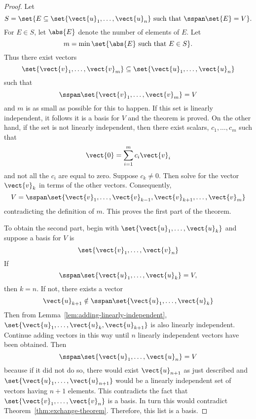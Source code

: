 \begin{proof}Let 
\begin{equation*}
S=\set{E\subseteq \set{\vect{u}_{1},\ldots,\vect{u}_{n}}\text{ such that }%
\sspan\set{E} =V}.
\end{equation*}
For $E\in S$, let $\abs{E}$ denote the number of elements
of $E$. Let 
\begin{equation*}
m= \min \set{\abs{E}\text{ such that }E\in S}.
\end{equation*}
Thus there exist vectors 
\begin{equation*}
\set{\vect{v}_{1},\ldots,\vect{v}_{m}}\subseteq \set{\vect{u}_{1},\ldots,%
\vect{u}_{n}}
\end{equation*}
such that 
\begin{equation*}
\sspan\set{\vect{v}_{1},\ldots,\vect{v}_{m}} =V
\end{equation*}
and $m$ is as small as possible for this to happen. If this set is linearly
independent, it follows it is a basis for $V$ and the theorem is proved. On
the other hand, if the set is not linearly independent, then there exist
scalars, $c_{1},\ldots,c_{m}$ such that 
\begin{equation*}
\vect{0}=\sum_{i=1}^{m}c_{i}\vect{v}_{i}
\end{equation*}
and not all the $c_{i}$ are equal to zero. Suppose $c_{k}\neq 0$. Then solve for the
vector $\vect{v}_{k}$ in terms of the other vectors.
Consequently, 
\begin{equation*}
V=\sspan\set{\vect{v}_{1},\ldots,\vect{v}_{k-1},\vect{v}
_{k+1},\ldots,\vect{v}_{m}}
\end{equation*}
contradicting the definition of $m$. This proves the first part of the
theorem.

To obtain the second part, begin with $\set{\vect{u}_{1},\ldots,\vect{u}
_{k}}$ and suppose a basis for $V$ is 
\begin{equation*}
\set{\vect{v}_{1},\ldots,\vect{v}_{n}} 
\end{equation*}
If 
\begin{equation*}
\sspan\set{\vect{u}_{1},\ldots,\vect{u}_{k}} =V,
\end{equation*}
then $k=n$. If not, there exists a vector 
\begin{equation*}
\vect{u}_{k+1}\notin \sspan\set{\vect{u}_{1},\ldots,\vect{u}
_{k}}
\end{equation*}
Then from Lemma~\ref{lem:adding-linearly-independent}, $\set{\vect{u}_{1},\ldots,\vect{u}_{k},
\vect{u}_{k+1}}$ is also linearly independent. Continue adding vectors in
this way until $n$ linearly independent vectors have been obtained. Then 
\begin{equation*}
\sspan\set{\vect{u}_{1},\ldots,\vect{u}_{n}} =V
\end{equation*}
because if it did not do so, there would exist $\vect{u}_{n+1}$ as just
described and $\set{\vect{u}_{1},\ldots,\vect{u}_{n+1}} $
would be a linearly independent set of vectors having $n+1$ elements. This contradicts the fact that $\set{\vect{v}_{1},\ldots,\vect{v}_{n}} $ is a basis.
 In turn this would contradict Theorem~\ref{thm:exchange-theorem}. Therefore, this list is a
basis. 
\end{proof}

